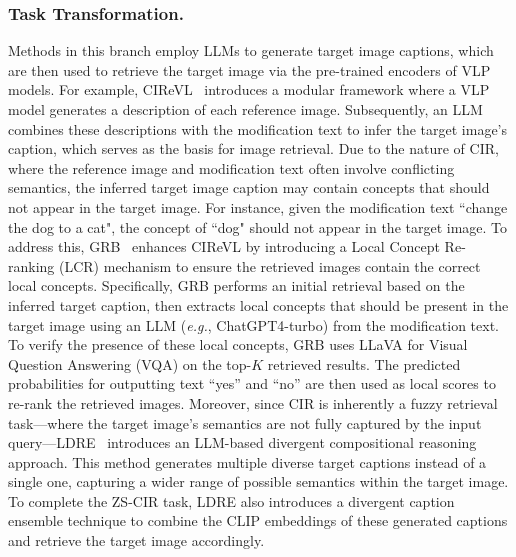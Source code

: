 \subsubsection{Task Transformation.} 
Methods in this branch employ LLMs to generate target image captions, which are then used to retrieve the target image via the pre-trained encoders of VLP models. For example, CIReVL~\cite{cirevl} introduces a modular framework where a VLP model generates a description of each reference image. Subsequently, an LLM combines these descriptions with the modification text to infer the target image's caption, which serves as the basis for image retrieval.
Due to the nature of CIR, where the reference image and modification text often involve conflicting semantics, the inferred target image caption may contain concepts that should not appear in the target image. For instance,  given the modification text ``change the dog to a cat", the concept of ``dog" should not appear in the target image.  To address this, GRB~\cite{grb} enhances CIReVL by introducing a Local Concept Re-ranking (LCR) mechanism to ensure the retrieved images contain the correct local concepts. Specifically, GRB performs an initial retrieval based on the inferred target caption, then extracts local concepts that should be present in the target image using an LLM (\textit{e.g.}, ChatGPT4-turbo) from the modification text. To verify the presence of these local concepts, GRB uses LLaVA for Visual Question Answering (VQA) on the top-$K$ retrieved results. The predicted probabilities for outputting text ``yes'' and ``no''  are then used as local scores to re-rank the retrieved images. Moreover, since CIR is inherently a fuzzy retrieval task—where the target image's semantics are not fully captured by the input query—LDRE~\cite{ldre} introduces an LLM-based divergent compositional reasoning approach. This method generates multiple diverse target captions instead of a single one, capturing a wider range of possible semantics within the target image. To complete the ZS-CIR task, LDRE also introduces a divergent caption ensemble technique to combine the CLIP embeddings of these generated captions and retrieve the target image accordingly.


